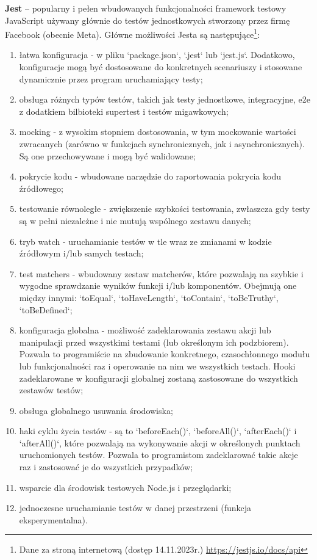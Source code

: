 \documentclass[12pt, a4paper, twoside, openany]{book}
\begin{document}
\textbf{Jest} -- popularny i pełen wbudowanych funkcjonalności framework testowy JavaScript używany głównie do testów jednostkowych stworzony przez firmę Facebook (obecnie Meta). Główne możliwości Jesta są następujące\footnote{Dane za stroną internetową (dostęp 14.11.2023r.) \url{https://jestjs.io/docs/api}}:
\begin{enumerate}[label=--]
    \item łatwa konfiguracja - w pliku `package.json`, `.jest` lub `jest.js`. Dodatkowo, konfiguracje mogą być dostosowane do konkretnych scenariuszy i stosowane dynamicznie przez program uruchamiający testy;
    \item obsługa różnych typów testów, takich jak testy jednostkowe, integracyjne, e2e z dodatkiem bilbioteki supertest i testów migawkowych;
    \item mocking - z wysokim stopniem dostosowania, w tym mockowanie wartości zwracanych (zarówno w funkcjach synchronicznych, jak i asynchronicznych). Są one przechowywane i mogą być walidowane;
    \item pokrycie kodu - wbudowane narzędzie do raportowania pokrycia kodu źródłowego;
    \item testowanie równoległe - zwiększenie szybkości testowania, zwłaszcza gdy testy są w pełni niezależne i nie mutują wspólnego zestawu danych;
    \item tryb watch - uruchamianie testów w tle wraz ze zmianami w kodzie źródłowym i/lub samych testach;
    \item test matchers - wbudowany zestaw matcherów, które pozwalają na szybkie i wygodne sprawdzanie wyników funkcji i/lub komponentów. Obejmują one między innymi: `toEqual`, `toHaveLength`, `toContain`, `toBeTruthy`, `toBeDefined`;
    \item konfiguracja globalna - możliwość zadeklarowania zestawu akcji lub manipulacji przed wszystkimi testami (lub określonym ich podzbiorem). Pozwala to programiście na zbudowanie konkretnego, czasochłonnego modułu lub funkcjonalności raz i operowanie na nim we wszystkich testach. Hooki zadeklarowane w konfiguracji globalnej zostaną zastosowane do wszystkich zestawów testów;
    \item obsługa globalnego usuwania środowiska;
    \item haki cyklu życia testów - są to `beforeEach()`, `beforeAll()`, `afterEach()` i `afterAll()`, które pozwalają na wykonywanie akcji w określonych punktach uruchomionych testów. Pozwala to programistom zadeklarować takie akcje raz i zastosować je do wszystkich przypadków;
    \item wsparcie dla środowisk testowych Node.js i przeglądarki;
    \item jednoczesne uruchamianie testów w danej przestrzeni (funkcja eksperymentalna).
\end{enumerate}
\end{document}
